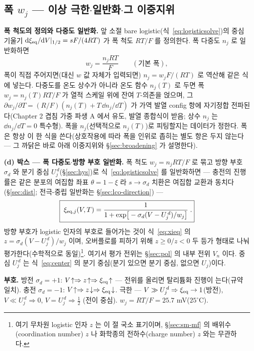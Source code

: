 \subsection{폭 $w_j$ --- 이상 극한$\cdot$일반화$\cdot$그 이중지위}\label{sec:width-w}
\textbf{폭 척도의 정의와 다중도 일반화.} 앞 소절 bare logistic(식~\eqref{eq:logisticsolve})의 중심 기울기
$\mathrm{d}\xi_{\mathrm{eq}}/\mathrm{d} V|_{1/2}=sF/(4RT)$ 가 폭 척도 $RT/F$ 를 정의한다. 폭 다중도 $n_j$ 로 일반화하면
\begin{equation}
w_j=\frac{n_jRT}{F}\qquad(\text{기본 폭}),
\label{eq:wbase}
\end{equation}
폭이 직접 주어지면(대신 $w$ 값 자체가 입력되면) $n_j=w_jF/(RT)$ 로 역산해 같은 식에 넣는다.
다중도를 온도 상수가 아니라 온도 함수 $n_j(T)$ 로 두면 폭 $w_j=n_j(T)RT/F$ 가 열적 스케일 위에 잔여 $T$-의존을
얹으며, 그 $\partial w_j/\partial T=(R/F)(n_j(T)+T\,\dd n_j/\dd T)$ 가 가역 발열 config 항에 자기정합 전파된다(Chapter 2
겹침 가중 파생 A 에서 유도, 발열 종합식이 받음; 상수 $n_j$ 는 $\dd n_j/\dd T{=}0$ 특수형). 폭을 $n_j$(선택적으로 $n_j(T)$)로 피팅할지는 데이터가 정한다.
폭은 항상 이 한 식을 쓴다(상호작용에 따라 폭을 인위로 좁히는 별도 항은 두지 않는다 --- 그 까닭은 바로 아래
이중지위와 \S\ref{sec:broadening} 가 설명한다).

\textbf{(d) 박스 --- 폭 다중도$\cdot$방향 부호 일반화.} 폭 척도 $w_j=n_jRT/F$ 로 묶고 방향 부호 $\sigma_d$ 와 분기
중심 $U_j^{\,d}$(\S\ref{sec:hys})로 식~\eqref{eq:logisticsolve} 를 일반화하면 --- 충전의 진행률은 같은 분포의
여집합 좌표 $\theta=1-\xi$ 라 $s\to\sigma_d$ 치환은 여집합 교환과 동치다(\S\ref{sec:dist}; 전극-중립
일반화는 \S\ref{sec:lco-direction}) ---
\begin{equation}
\boxed{\;\xi_{\mathrm{eq},j}(V,T)=\frac{1}{1+\exp\!\big[-\sigma_d(V-U_j^{\,d})/w_j\big]}\;.}
\label{eq:xieq}
\end{equation}
방향 부호가 logistic 인자의 부호로 들어가는 것이 식~\eqref{eq:xieq} 의 $z=\sigma_d(V-U_j^{\,d})/w_j$ 이며,
오버플로를 피하기 위해 $z\ge0/z<0$ 두 등가 형태로 나눠 평가한다(수학적으로
동일)\footnote{여기 무차원 logistic 인자 $z$ 는 이 절 국소 표기이며, \S\ref{sec:sm-mf} 의 배위수(coordination
number) $z$ 나 화학종의 전하수(charge number) $z$ 와는 무관하다.}. 여기서 평가 전위는 \S\ref{sec:pol} 의 내부 전위 $V_n$ 이다. 중심 $U_j^{\,d}$
는 식~\eqref{eq:center} 의 분기 중심(분기 있으면 분기 중심, 없으면 $U_j$)이다.

\begin{signbox}
\textbf{부호.} 방전 $\sigma_d=+1$: $V\!\uparrow\Rightarrow z\!\uparrow\Rightarrow\xi_{\mathrm{eq}}\!\uparrow$ --- 전위를 올리면
탈리튬화 진행이 는다(규약 일치). 충전 $\sigma_d=-1$: $V\!\uparrow\Rightarrow z\!\downarrow\Rightarrow\xi_{\mathrm{eq}}\!\downarrow$.
극한 --- $V\gg U_j^{\,d}\Rightarrow\xi_{\mathrm{eq}}\to1$(방전), $V\ll U_j^{\,d}\Rightarrow0$, $V=U_j^{\,d}\Rightarrow\tfrac12$
(전이 중심). $w_j=RT/F=25.7$ mV($25^\circ$C).
\end{signbox}

